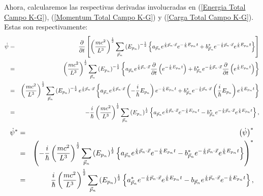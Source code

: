 Ahora, calcularemos las respectivas derivadas involucradas en (\ref{Energia
Total Campo K-G}), (\ref{Momentum Total Campo K-G}) y (\ref{Carga Total
Campo K-G}). Estas son respectivamente:%
\begin{eqnarray*}
\dot{\psi} &=&\frac{\partial }{\partial t}\left[ \left( \frac{mc^{2}}{L^{3}}%
\right) ^{\frac{1}{2}}\sum_{\vec{p}_{n}}\left( E_{p_{n}}\right) ^{-\frac{1}{2%
}}\left\{ a_{\vec{p}_{n}}e^{\frac{i}{\hbar }\vec{p}_{n}\cdot \vec{x}}e^{-%
\frac{i}{\hbar }E_{p_{n}}t}+b_{\vec{p}_{n}}^{\ast }e^{-\frac{i}{\hbar }\vec{p%
}_{n}\cdot \vec{x}}e^{\frac{i}{\hbar }E_{p_{n}}t}\right\} \right]  \\
&=&\left( \frac{mc^{2}}{L^{3}}\right) ^{\frac{1}{2}}\sum_{\vec{p}_{n}}\left(
E_{p_{n}}\right) ^{-\frac{1}{2}}\left\{ a_{\vec{p}_{n}}e^{\frac{i}{\hbar }%
\vec{p}_{n}\cdot \vec{x}}\frac{\partial }{\partial t}\left( e^{-\frac{i}{%
\hbar }E_{p_{n}}t}\right) +b_{\vec{p}_{n}}^{\ast }e^{-\frac{i}{\hbar }\vec{p}%
_{n}\cdot \vec{x}}\frac{\partial }{\partial t}\left( e^{\frac{i}{\hbar }%
E_{p_{n}}t}\right) \right\}  \\
&=&\left( \frac{mc^{2}}{L^{3}}\right) ^{\frac{1}{2}}\sum_{\vec{p}_{n}}\left(
E_{p_{n}}\right) ^{-\frac{1}{2}}e^{\frac{i}{\hbar }\vec{p}_{n}\cdot \vec{x}%
}\left\{ a_{\vec{p}_{n}}e^{\frac{i}{\hbar }\vec{p}_{n}\cdot \vec{x}}\left( -%
\frac{i}{\hbar }E_{p_{n}}\right) e^{-\frac{i}{\hbar }E_{p_{n}}t}+b_{\vec{p}%
_{n}}^{\ast }e^{-\frac{i}{\hbar }\vec{p}_{n}\cdot \vec{x}}\left( \frac{i}{%
\hbar }E_{p_{n}}\right) e^{\frac{i}{\hbar }E_{p_{n}}t}\right\}  \\
&=&-\frac{i}{\hbar }\left( \frac{mc^{2}}{L^{3}}\right) ^{\frac{1}{2}}\sum_{%
\vec{p}_{n}}\left( E_{p_{n}}\right) ^{\frac{1}{2}}\left\{ a_{\vec{p}_{n}}e^{%
\frac{i}{\hbar }\vec{p}_{n}\cdot \vec{x}}e^{-\frac{i}{\hbar }E_{p_{n}}t}-b_{%
\vec{p}_{n}}^{\ast }e^{-\frac{i}{\hbar }\vec{p}_{n}\cdot \vec{x}}e^{\frac{i}{%
\hbar }E_{p_{n}}t}\right\} ,
\end{eqnarray*}%
\begin{eqnarray*}
\dot{\psi}^{\ast } &=&\left( \dot{\psi}\right) ^{\ast } \\
&=&\left( -\frac{i}{\hbar }\left( \frac{mc^{2}}{L^{3}}\right) ^{\frac{1}{2}%
}\sum_{\vec{p}_{n}}\left( E_{p_{n}}\right) ^{\frac{1}{2}}\left\{ a_{\vec{p}%
_{n}}e^{\frac{i}{\hbar }\vec{p}_{n}\cdot \vec{x}}e^{-\frac{i}{\hbar }%
E_{p_{n}}t}-b_{\vec{p}_{n}}^{\ast }e^{-\frac{i}{\hbar }\vec{p}_{n}\cdot \vec{%
x}}e^{\frac{i}{\hbar }E_{p_{n}}t}\right\} \right) ^{\ast } \\
&=&\frac{i}{\hbar }\left( \frac{mc^{2}}{L^{3}}\right) ^{\frac{1}{2}}\sum_{%
\vec{p}_{n}}\left( E_{p_{n}}\right) ^{\frac{1}{2}}\left\{ a_{\vec{p}%
_{n}}^{\ast }e^{-\frac{i}{\hbar }\vec{p}_{n}\cdot \vec{x}}e^{\frac{i}{\hbar }%
E_{p_{n}}t}-b_{\vec{p}_{n}}e^{\frac{i}{\hbar }\vec{p}_{n}\cdot \vec{x}}e^{-%
\frac{i}{\hbar }E_{p_{n}}t}\right\} ,
\end{eqnarray*}%
